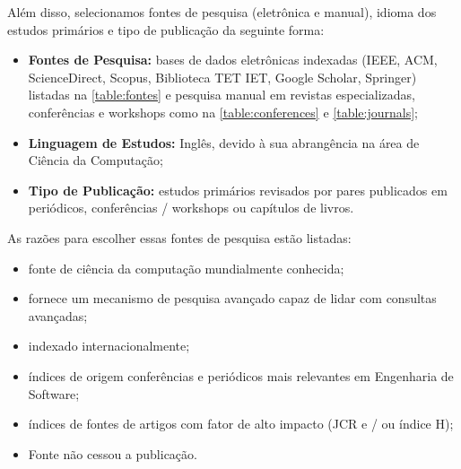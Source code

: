 Além disso, selecionamos fontes de pesquisa (eletrônica e manual), idioma dos estudos primários e tipo de publicação da seguinte forma:

\begin{itemize}
	\item \textbf{Fontes de Pesquisa:} bases de dados eletrônicas indexadas (IEEE, ACM, ScienceDirect, Scopus, Biblioteca TET IET, Google Scholar, Springer) listadas na \ref{table:fontes} e pesquisa manual em revistas especializadas, conferências e workshops como na \ref{table:conferences} e \ref{table:journals};
	
	\item \textbf{Linguagem de Estudos:} Inglês, devido à sua abrangência na área de Ciência da Computação;
	
	\item \textbf{Tipo de Publicação:} estudos primários revisados por pares publicados em periódicos, conferências / workshops ou capítulos de livros.
\end{itemize}

As razões para escolher essas fontes de pesquisa estão listadas:

\begin{itemize}
	\item fonte de ciência da computação mundialmente conhecida;
	\item fornece um mecanismo de pesquisa avançado capaz de lidar com consultas avançadas;
	\item indexado internacionalmente;
	\item índices de origem conferências e periódicos mais relevantes em Engenharia de Software;
	\item índices de fontes de artigos com fator de alto impacto (JCR e / ou índice H);
	\item Fonte não cessou a publicação.
\end{itemize}

